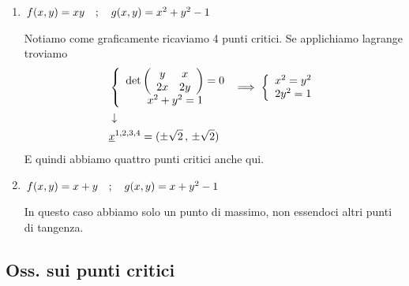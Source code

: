 \begin{enumerate}
	\item $f(x,y)=xy \quad ; \quad g(x,y)=x^2 + y^2 -1$
	\begin{figure}[!htb]
	\end{figure}	
	Notiamo come graficamente ricaviamo 4 punti critici.
	Se applichiamo lagrange troviamo
	\begin{align}
		{}&\left\{\begin{array}{cc} \det \left( \begin{array}{ccc} y & x \\ 2x & 2y \end{array} \right)=0 \\ x^2 + y^2 =1 \end{array}\right. \implies \left\{\begin{array}{cc} x^2 = y^2 \\ 2y^2=1 \end{array}\right.\nonumber \\ &\downarrow \nonumber \\ &\underline{x}^{1,2,3,4}=(\pm \sqrt{2} \, , \,\pm \sqrt{2})
	\end{align}
	E quindi abbiamo quattro punti critici anche qui.
	
	\newpage
	\item $f(x,y)=x+y \quad ; \quad g(x,y)=x + y^2 -1$
	\begin{figure}[!htb]
	\end{figure}
	
	
	In questo caso abbiamo solo un punto di massimo, non essendoci altri punti di tangenza. 
\end{enumerate}

\subsection{Oss. sui punti critici}

